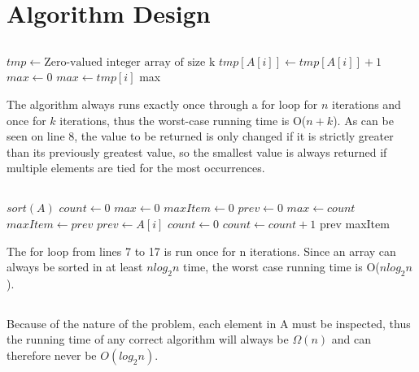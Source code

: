 \documentclass{article}
\begin{document}
\section{Algorithm Design}
\subsection{}
	\begin{algorithmic}[1]
		\State $tmp \gets \textrm{Zero-valued integer array of size k}$
			\State $tmp[A[i]] \gets tmp[A[i]]+1$
		\EndFor
		\State $max \gets 0$
				\State $max \gets tmp[i]$
			\EndIf
		\EndFor
		\State \Return max
		\EndFunction
	\end{algorithmic}
	The algorithm always runs exactly once through a for loop for $n$ iterations and once for $k$ iterations, thus the worst-case running time is O($n+k$).
	As can be seen on line 8, the value to be returned is only changed if it is strictly greater than its previously greatest value, so the smallest value
	is always returned if multiple elements are tied for the most occurrences.
\subsection{}
	\begin{algorithmic}[1]
		\State $sort(A)$
		\State $count \gets 0$
		\State $max \gets 0$
		\State $maxItem \gets 0$
		\State $prev \gets 0$
					\State $max \gets count$
					\State $maxItem \gets prev$
				\EndIf
				\State $prev \gets A[i]$
				\State $count \gets 0$
			\EndIf
			\State $count \gets count+1$
		\EndFor
			\State \Return prev
		\EndIf
		\State \Return maxItem
		\EndFunction
	\end{algorithmic}
	The for loop from lines 7 to 17 is run once for n iterations. Since an array can always be sorted in at least $nlog_2{n}$ time,
	the worst case running time is O($nlog_2{n}$).
\subsection{}
	Because of the nature of the problem, each element in A must be inspected, thus the running time of any correct algorithm will always be $\Omega(n)$ and can therefore never be $O(log_2{n})$.
\end{document}
